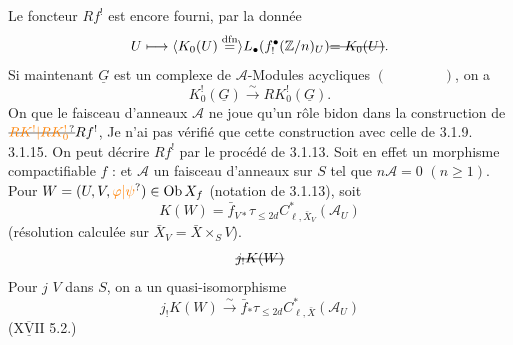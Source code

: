 Le foncteur $Rf^!$ est encore fourni,  par la donnée
\[
 U\longmapsto\inserted{K_0(U)\overset{\mathrm{dfn}}{=}}L_\bullet(f_!^\bullet(\mathbb Z/n)_U)\deleted{=K_0(U)}.
\]
Si maintenant $\underline G$ est un complexe de $\mathcal A$-Modules acycliques $(\qquad\qquad)$, on a
\[
 K_0^!(\underline G)\xrightarrow{\sim}RK_0^!(\underline G).
\]
On  que le faisceau d'anneaux $\mathcal A$ ne joue qu'un rôle bidon dans la construction de $\deleted{\unsure{RK^!|RK_0^!}} Rf^!$, 
Je n'ai pas vérifié que cette construction  avec celle de 3.1.9.
3.1.15. On peut  décrire $Rf^!$ par le procédé de 3.1.13.  Soit en effet un morphisme compactifiable $f$ :
et $\mathcal A$ un faisceau d'anneaux sur $S$ tel que $n\mathcal A=0$ $(n\geq1)$. Pour $W=(U,V,\unsure{\varphi|\psi})\in\mathrm{Ob}\,X_f$ (notation de 3.1.13), soit
\[
 K(W)=\bar f_{V*}\tau_{\leq 2d}C^*_{\ell,\bar X_V}(\mathcal A_U)
 \tag*{(3.1.15.1)}
\]
(résolution calculée sur $\bar X_V=\bar X\times_S V$). 
\[
 \deleted{j_!K(W)}
\]
Pour $j$  $V$ dans $S$, on a un quasi-isomorphisme
\[
 j_!K(W)\xrightarrow{\sim}\bar f_*\tau_{\leq 2d}C^*_{\ell,\bar X}(\mathcal A_U)
\]
($\overline{\underline{\mathrm{XVII}}}$ 5.2.)
